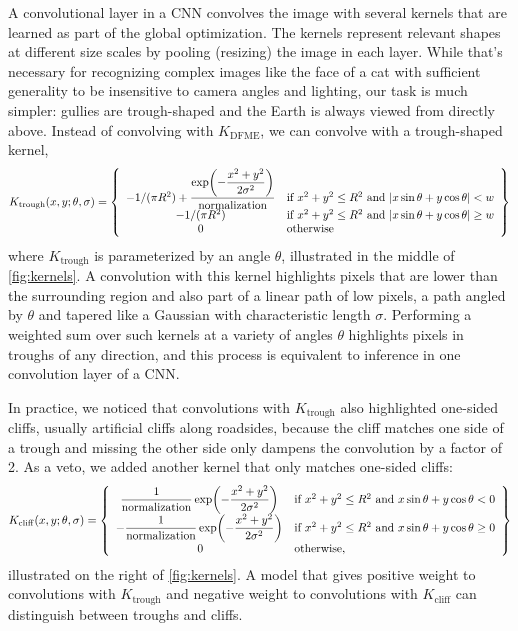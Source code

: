 A convolutional layer in a CNN convolves the image with several kernels that are learned as part of the global optimization. The kernels represent relevant shapes at different size scales by pooling (resizing) the image in each layer. While that's necessary for recognizing complex images like the face of a cat with sufficient generality to be insensitive to camera angles and lighting, our task is much simpler: gullies are trough-shaped and the Earth is always viewed from directly above. Instead of convolving with $K_{\mathrm{DFME}}$, we can convolve with a trough-shaped kernel,
\[
K_{\mathrm{trough}}(x,y;\theta, \sigma)=
\left\{\begin{array}{c l}
-1/(\pi R^2)
+\dfrac{\exp\!\left(-\dfrac{x^2+y^2}{2\sigma^2}\right)}
{\text{normalization}}
& \text{if } x^2+y^2\le R^2 \text{ and } |x\sin\theta+y\cos\theta|<w \\
-1/(\pi R^2)
& \text{if } x^2+y^2\le R^2 \text{ and } |x\sin\theta+y\cos\theta|\ge w \\
0
& \text{otherwise}
\end{array}\right\}
\]
where $K_{\mathrm{trough}}$ is parameterized by an angle $\theta$, illustrated in the middle of \cref{fig:kernels}. A convolution with this kernel highlights pixels that are lower than the surrounding region and also part of a linear path of low pixels, a path angled by $\theta$ and tapered like a Gaussian with characteristic length $\sigma$. Performing a weighted sum over such kernels at a variety of angles $\theta$ highlights pixels in troughs of any direction, and this process is equivalent to inference in one convolution layer of a CNN.

In practice, we noticed that convolutions with $K_{\mathrm{trough}}$ also highlighted one-sided cliffs, usually artificial cliffs along roadsides, because the cliff matches one side of a trough and missing the other side only dampens the convolution by a factor of 2. As a veto, we added another kernel that only matches one-sided cliffs:
\[
K_{\mathrm{cliff}}(x,y;\theta, \sigma)=
\left\{\begin{array}{c l}
\dfrac{1}{\text{normalization}} \, {\exp\!\left(-\dfrac{x^2+y^2}{2\sigma^2}\right)}
& \text{if } x^2+y^2\le R^2 \text{ and } x\sin\theta+y\cos\theta < 0 \\
-\dfrac{1}{\text{normalization}} \, {\exp\!\left(-\dfrac{x^2+y^2}{2\sigma^2}\right)}
& \text{if } x^2+y^2\le R^2 \text{ and } x\sin\theta+y\cos\theta \ge 0 \\
 \, 0
& \text{otherwise,}
\end{array}\right\}
\]
illustrated on the right of \cref{fig:kernels}. A model that gives positive weight to convolutions with $K_{\mathrm{trough}}$ and negative weight to convolutions with $K_{\mathrm{cliff}}$ can distinguish between troughs and cliffs.

